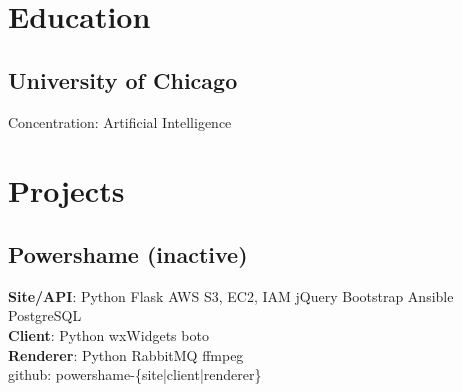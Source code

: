 \documentclass[]{resume}
\begin{document}
%
%
\lastupdated

%
%

%
%

\begin{minipage}[t]{0.33\textwidth} 


\section{Education} 

\subsection{University of Chicago}
Concentration: Artificial Intelligence
\sectionsep


\section{Projects} 
\subsection{Powershame (inactive)}
\textbf{Site/API}: Python \textbullet{} Flask \textbullet{} 
AWS S3, EC2, IAM \textbullet{}  jQuery \textbullet{} Bootstrap 
\textbullet{} Ansible \textbullet{} PostgreSQL \\
\textbf{Client}: Python \textbullet{} wxWidgets \textbullet{} boto \\
\textbf{Renderer}: Python \textbullet{} RabbitMQ \textbullet{} ffmpeg \\
github: powershame-\{site|client|renderer\}
\sectionsep


\end{minipage}
\end{document}
